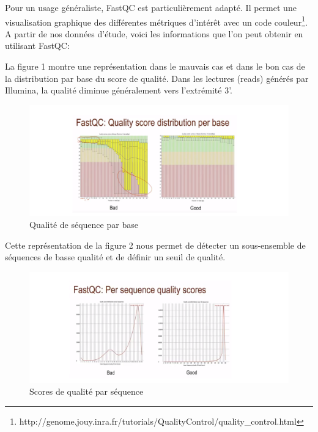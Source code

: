 \documentclass[a4paper,11pt]{article}
\begin{document}
Pour un usage généraliste, FastQC est particulièrement adapté. Il
permet une visualisation graphique des différentes métriques d'intérêt
avec un code
couleur\footnote{{http://genome.jouy.inra.fr/tutorials/QualityControl/quality_control.html}}. A
partir de nos données d'étude, voici les informations que l'on peut
obtenir en utilisant FastQC:

La figure 1 montre une représentation dans le mauvais cas et dans le
bon cas de la distribution par base du score de qualité. Dans les
lectures (reads) générés par Illumina, la qualité diminue généralement vers
l'extrémité 3'.

\begin{figure}
  \begin{center}
    \includegraphics[width=16cm]{Images/Fastqc_Plots1}
  \end{center}
  \caption{Qualité de séquence par base}
  \label{fig-Fastqc_Plots1}
\end{figure}

Cette représentation de la figure 2 nous permet de détecter un sous-ensemble de séquences de basse qualité et de définir un seuil de qualité.

\begin{figure}
  \begin{center}
    \includegraphics[width=16cm]{Images/Fastqc_Plots2}
  \end{center}
  \caption{Scores de qualité par séquence}
  \label{fig-Fastqc_Plots2}
\end{figure}
\end{document}
